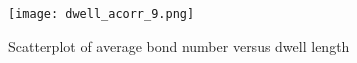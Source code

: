 \documentclass{article}
\newcommand{\tn}{\textnormal}
\begin{document}
\begin{figure}[h]
  \centering
  \texttt{[image: dwell\_acorr\_9.png]}
  \caption{Scatterplot of average bond number versus dwell length}
  \label{fig:dwell-corrs-9}
\end{figure}


\end{document}
